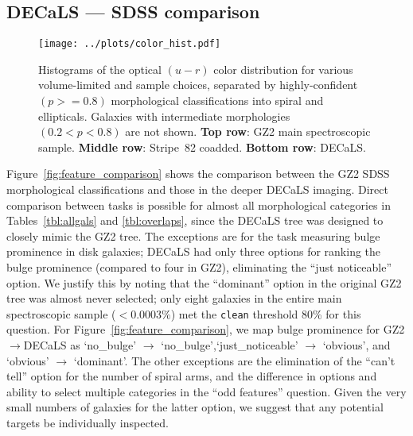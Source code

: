 \documentclass[iop,apj,tighten]{emulateapj}
\begin{document}
\subsection{DECaLS --- SDSS comparison}

\begin{figure*}
\centering
\texttt{[image: ../plots/color\_hist.pdf]}
\caption{Histograms of the optical $(u-r)$ color distribution for various volume-limited and sample choices, separated by highly-confident $(p >= 0.8)$ morphological classifications into spiral and ellipticals. Galaxies with intermediate morphologies $(0.2 < p < 0.8)$ are not shown. \textbf{Top row}: GZ2 main spectroscopic sample. \textbf{Middle row}: Stripe~82 coadded. \textbf{Bottom row}: DECaLS. \label{fig:color_hist}}
\end{figure*}

Figure~\ref{fig:feature_comparison} shows the comparison between the GZ2 SDSS morphological classifications and those in the deeper DECaLS imaging. Direct comparison between tasks is possible for almost all morphological categories in Tables~\ref{tbl:allgals} and \ref{tbl:overlaps}, since the DECaLS tree was designed to closely mimic the GZ2 tree. The exceptions are for the task measuring bulge prominence in disk galaxies; DECaLS had only three options for ranking the bulge prominence (compared to four in GZ2), eliminating the ``just noticeable'' option. We justify this by noting that the ``dominant'' option in the original GZ2 tree was almost never selected; only eight galaxies in the entire main spectroscopic sample ($<0.0003\%$) met the \texttt{clean} threshold 80\% for this question. For Figure~\ref{fig:feature_comparison}, we map bulge prominence for GZ2$\rightarrow$DECaLS as `no\_bulge' $\rightarrow$ `no\_bulge',`just\_noticeable' $\rightarrow$ `obvious', and `obvious' $\rightarrow$ `dominant'. The other exceptions are the elimination of the ``can't tell'' option for the number of spiral arms, and the difference in options and ability to select multiple categories in the ``odd features'' question. Given the very small numbers of galaxies for the latter option, we suggest that any potential targets be individually inspected. 
\end{document}
